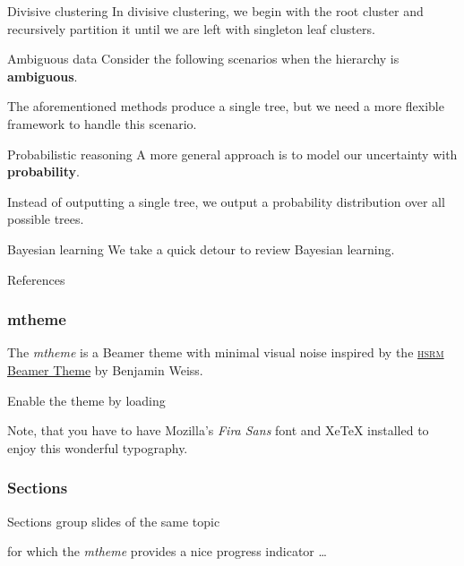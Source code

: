 \documentclass[10pt, compress]{beamer}
\begin{document}
\begin{frame}{Divisive clustering}
  In divisive clustering, we begin with the root cluster
  and recursively partition it until we are left with
  singleton leaf clusters.
\end{frame}

\begin{frame}{Ambiguous data}
  Consider the following scenarios when the hierarchy is
  \textbf{ambiguous}.

  The aforementioned methods produce a single tree,
  but we need a more flexible framework to handle
  this scenario.
\end{frame}

\begin{frame}{Probabilistic reasoning}
  A more general approach is to
  model our uncertainty with \textbf{probability}.

  Instead of outputting a single tree,
  we output a probability distribution over all possible
  trees.
\end{frame}

\begin{frame}{Bayesian learning}
  We take a quick detour to review Bayesian learning.
\end{frame}

\begin{frame}{References}
  
\end{frame}

\begin{frame}[fragile]
  \frametitle{mtheme}

  The \emph{mtheme} is a Beamer theme with minimal visual noise inspired by the
  \href{https://github.com/hsrmbeamertheme/hsrmbeamertheme}{\textsc{hsrm} Beamer
  Theme} by Benjamin Weiss.

  Enable the theme by loading


  Note, that you have to have Mozilla's \emph{Fira Sans} font and XeTeX
  installed to enjoy this wonderful typography.
\end{frame}

\begin{frame}[fragile]
  \frametitle{Sections}
  Sections group slides of the same topic


  for which the \emph{mtheme} provides a nice progress indicator \ldots
\end{frame}
\end{document}
